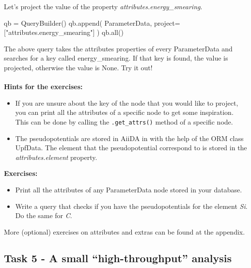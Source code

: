 Let's project the value of the property \emph{attributes.energy\_smearing}.
\begin{pythoncommand}
qb = QueryBuilder()
qb.append(
        ParameterData,
        project=["attributes.energy_smearing"]
    )
qb.all()
\end{pythoncommand}
The above query takes the attributes properties of every ParameterData and searches for a
key called energy\_smearing. If that key is found, the value is projected,
otherwise the value is None.  Try it out!
~\\~\\

\textbf{Hints for the exercises:}
\begin{itemize}
\item If you are unsure about the key of the node that you would like to project, you can print all the attributes of a specific node to get some inspiration. This can be done by calling the \texttt{.get\_attrs()} method of a specific node.
\item The pseudopotentials are stored in AiiDA in with the help of the ORM class UpfData. The element that the pseudopotential correspond to is stored in the \emph{attributes.element} property.
\end{itemize}

\begin{tcolorbox}
\textbf{Exercises:}
\begin{itemize}
	\item Print all the attributes of any ParameterData node stored in your database.
	\item Write a query that checks if you have the pseudopotentials for the element \textit{Si}. Do the same for \textit{C}.
\end{itemize}
More (optional) exercises on attributes and extras can be found at the appendix.
\end{tcolorbox}


\subsection*{Task 5 - A small ``high-throughput'' analysis}

